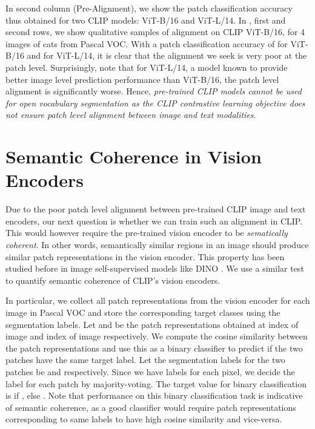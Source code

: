 \documentclass[10pt,twocolumn,letterpaper]{article}
\begin{document}
In  second column (Pre-Alignment), we show the patch classification accuracy thus obtained for two CLIP models: ViT-B/16 and ViT-L/14. In , first and second rows, we show qualitative samples of alignment on CLIP ViT-B/16, for 4 images of cats from Pascal VOC. With a patch classification accuracy of  for ViT-B/16 and  for ViT-L/14, it is clear that the alignment we seek is very poor at the patch level. Surprisingly, note that for ViT-L/14, a model known to provide better image level prediction performance than ViT-B/16, the patch level alignment is significantly worse. Hence, \emph{pre-trained CLIP models cannot be used for open vocabulary segmentation as the CLIP contrastive learning objective does not ensure patch level alignment between image and text modalities}.

\section{Semantic Coherence in Vision Encoders}
\label{sec:semantic_coherence}

Due to the poor patch level alignment between pre-trained CLIP image and text encoders, our next question is whether we can train such an alignment in CLIP. This would however require the pre-trained vision encoder to be \emph{sematically coherent}. In other words, semantically similar regions in an image should produce similar patch representations in the vision encoder. This property has been studied before in image self-supervised models like DINO \cite{hamilton2022unsupervised}. We use a similar test to quantify semantic coherence of CLIP's vision encoders.

In particular, we collect all patch representations from the vision encoder for each image in Pascal VOC and store the corresponding target classes using the segmentation labels. Let  and  be the patch representations obtained at index  of image  and index  of image  respectively. We compute the cosine similarity  between the patch representations and use this as a binary classifier to predict if the two patches have the same target label. Let the segmentation labels for the two patches be  and  respectively. Since we have labels for each pixel, we decide the label for each patch by majority-voting. The target value for binary classification is  if , else . Note that performance on this binary classification task is indicative of semantic coherence, as a good classifier would require patch representations corresponding to same labels to have high cosine similarity and vice-versa.
\end{document}
